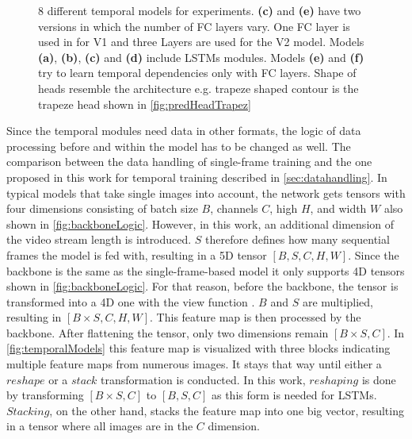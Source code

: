 \begin{figure}[H]
    \caption{8 different temporal models for experiments. \textbf{(c)} and \textbf{(e)} have two versions in which the number of \ac{FC} layers vary. One \ac{FC} layer is used in for V1 and three Layers are used for the V2 model. Models \textbf{(a)}, \textbf{(b)}, \textbf{(c)} and \textbf{(d)} include LSTMs modules. Models \textbf{(e)} and \textbf{(f)} try to learn temporal dependencies only with \ac{FC} layers. Shape of heads resemble the architecture e.g. trapeze shaped contour is the trapeze head shown in \autoref{fig:predHeadTrapez}}
    \label{fig:temporalModels}
\end{figure}

Since the temporal modules need data in other formats, the logic of data processing before and within the model has to be changed as well.
The comparison between the data handling of single-frame training and the one proposed in this work for temporal training described in \autoref{sec:datahandling}.
In typical models that take single images into account, the network gets tensors with four dimensions consisting of batch size $B$, channels $C$, high $H$, and width $W$ also shown in \autoref{fig:backboneLogic}.
However, in this work, an additional dimension of the video stream length is introduced.
$S$ therefore defines how many sequential frames the model is fed with, resulting in a 5D tensor $[B, S, C, H, W]$.
Since the backbone is the same as the single-frame-based model it only supports 4D tensors shown in \autoref{fig:backboneLogic}.
For that reason, before the backbone, the tensor is transformed into a 4D one with the view function \cite{pytorch_view_docu}.
$B$ and $S$ are multiplied, resulting in $[B \times S, C, H, W]$.
This feature map is then processed by the backbone.
After flattening the tensor, only two dimensions remain $[B \times S, C]$.
In \autoref{fig:temporalModels} this feature map is visualized with three blocks indicating multiple feature maps from numerous images.
It stays that way until either a $reshape$ or a $stack$ transformation is conducted.
In this work, $reshaping$ is done by transforming $[B \times S, C]$ to $[B, S, C]$ as this form is needed for LSTMs.
$Stacking$, on the other hand, stacks the feature map into one big vector, resulting in a tensor where all images are in the $C$ dimension. 

